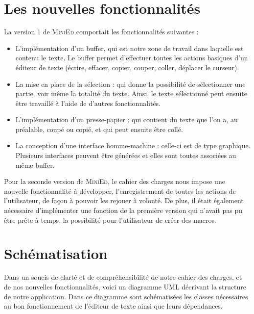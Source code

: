 \documentclass[a4paper, 12pt]{report}
\begin{document}
		\section*{Les nouvelles fonctionnalités}

		La version 1 de \textsc{MiniEd} comportait les fonctionnalités suivantes :

		\begin{itemize}
			\item L'implémentation d’un buffer, qui est notre zone de travail dans laquelle est contenu le texte. Le buffer permet d'effectuer toutes les actions basiques d'un éditeur de texte (écrire, effacer, copier, couper, coller, déplacer le curseur).

			\item La mise en place de la sélection : qui donne la possibilité de sélectionner une partie, voir même la totalité du texte. Ainsi, le texte sélectionné peut ensuite être travaillé à l’aide de d’autres fonctionnalités.

			\item L’implémentation d’un presse-papier : qui contient du texte que l’on a, au préalable, coupé ou copié, et qui peut ensuite être collé.

			\item La conception d’une interface homme-machine : celle-ci est de type graphique. Plusieurs interfaces peuvent être générées et elles sont toutes associées au même buffer. 

		\end{itemize}

		\vspace{0.5cm}

		Pour la seconde version de \textsc{MiniEd}, le cahier des charges nous impose une nouvelle fonctionnalité à développer, l'enregistrement de toutes les actions de l'utilisateur, de façon à pouvoir les rejouer à volonté. De plus, il était également nécessaire d'implémenter une fonction de la première version qui n'avait pas pu être prête à temps, la possibilité pour l'utilisateur de créer des macros.

		\section*{Schématisation}

		Dans un soucis de clarté et de compréhensibilité de notre cahier des charges, et de nos nouvelles fonctionnalités, voici un diagramme UML décrivant la structure de notre application. Dans ce diagramme sont schématisées les classes nécessaires au bon fonctionnement de l’éditeur de texte ainsi que leurs dépendances.
    
\end{document}
